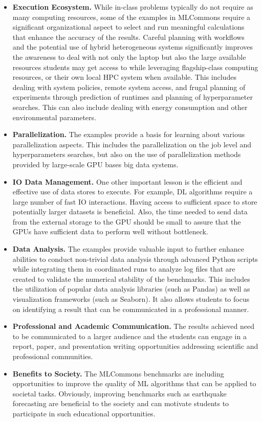 \documentclass[utf8]{FrontiersinVancouver} %
\begin{document}
\begin{itemize}
\item {\bf Execution Ecosystem.} While in-class problems typically do not require as many computing resources, some of the examples in MLCommons require a significant organizational aspect to select and run meaningful calculations that enhance the accuracy of the results. Careful planning with workflows and the potential use of hybrid heterogeneous systems significantly improves the awareness to deal with not only the laptop but also the large available resources students may get access to while leveraging flagship-class computing resources, or their own local HPC system when available. This includes dealing with system policies, remote system access, and frugal planning of experiments through prediction of runtimes and planning of hyperparameter searches. This can also include dealing with energy consumption and other environmental parameters.

\item {\bf Parallelization.} The examples provide a basis for learning about various parallelization aspects. This includes the parallelization on the job level and hyperparameters searches, but also on the use of parallelization methods provided by large-scale GPU bases big data systems.

\item {\bf IO Data Management.} One other important lesson is the efficient and effective use of data stores to execute.  For example, DL algorithms require a large number of fast IO interactions.  Having access to sufficient space to store potentially larger datasets is beneficial. Also, the time needed to send data from the external storage to the GPU should be small to assure that the GPUs have sufficient data to perform well without bottleneck.

\item {\bf Data Analysis.} The examples provide valuable input to further enhance abilities to conduct non-trivial data analysis through advanced Python scripts while integrating them in coordinated runs to analyze log files that are created to validate the numerical stability of the benchmarks. This includes the utilization of popular data analysis libraries (such as Pandas) as well as visualization frameworks (such as Seaborn). It also allows students to focus on identifying a result that can be communicated in a professional manner.

\item {\bf Professional and Academic Communication.} The results  achieved need to be communicated to a larger audience and the  students can engage in a report, paper, and presentation writing  opportunities addressing scientific and professional communities.

\item {\bf Benefits to Society.} The MLCommons benchmarks are  including opportunities to improve the quality of ML algorithms that  can be applied to societal tasks. Obviously, improving benchmarks  such as earthquake forecasting are beneficial to the society and can  motivate students to participate in such educational opportunities.

\end{itemize}
\end{document}
